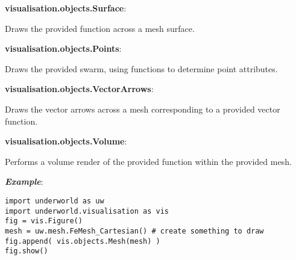 \documentclass[10pt,landscape]{article}
\begin{document}
\begin{multicols}{2}
\noindent\textbf{visualisation.objects.Surface}:
\begin{addmargin}[1em]{2em}
Draws the provided function across a mesh surface.
\end{addmargin}

\noindent\textbf{visualisation.objects.Points}:
\begin{addmargin}[1em]{2em}
Draws the provided swarm, using functions to determine point attributes.
\end{addmargin}

\noindent\textbf{visualisation.objects.VectorArrows}:
\begin{addmargin}[1em]{2em}
Draws the vector arrows across a mesh corresponding to a provided vector function.
\end{addmargin}

\noindent\textbf{visualisation.objects.Volume}:
\begin{addmargin}[1em]{2em}
Performs a volume render of the provided function within the provided mesh.
\end{addmargin}


\vspace{2mm}
\noindent\textbf{\textit{Example}}:
\begin{lstlisting}
import underworld as uw
import underworld.visualisation as vis
fig = vis.Figure()
mesh = uw.mesh.FeMesh_Cartesian() # create something to draw
fig.append( vis.objects.Mesh(mesh) )
fig.show()
\end{lstlisting}

\end{multicols}
\end{document}
